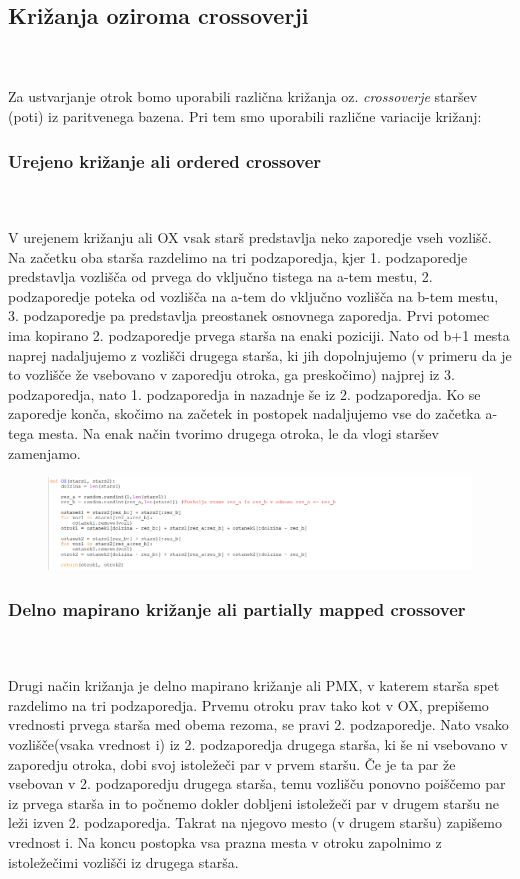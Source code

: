 \documentclass[12pt,a4paper]{amsart}
\theoremstyle{definition} %
\theoremstyle{plain} %
\begin{document}
\subsection{Križanja oziroma crossoverji}
\
\\
\\
Za ustvarjanje otrok bomo uporabili različna križanja oz. \textit{crossoverje} staršev (poti) iz paritvenega bazena. Pri tem smo uporabili različne variacije križanj: 
\\
\subsubsection{Urejeno križanje ali ordered crossover}
\
\\
\\
V urejenem križanju ali OX vsak starš predstavlja neko zaporedje vseh vozlišč. Na začetku oba starša razdelimo na tri podzaporedja, kjer 1. podzaporedje predstavlja vozlišča od prvega do vključno tistega na a-tem mestu, 2. podzaporedje poteka od vozlišča na a-tem do vključno vozlišča na b-tem mestu, 3. podzaporedje pa predstavlja preostanek osnovnega zaporedja. Prvi potomec ima kopirano 2. podzaporedje prvega starša na enaki poziciji. Nato od b+1 mesta naprej nadaljujemo z vozlišči drugega starša, ki jih dopolnjujemo (v primeru da je to vozlišče že vsebovano v zaporedju otroka, ga preskočimo) najprej iz 3. podzaporedja, nato 1. podzaporedja in nazadnje še iz 2. podzaporedja. Ko se zaporedje konča, skočimo na začetek in postopek nadaljujemo vse do začetka a-tega mesta. 
Na enak način tvorimo drugega otroka, le da vlogi staršev zamenjamo.

\begin{figure}[ht]
\centering
\includegraphics[width=1\textwidth]{OX}
\end{figure}
\newpage
\subsubsection{Delno mapirano križanje ali partially mapped crossover}
\
\\
\\
Drugi način križanja je delno mapirano križanje ali PMX, v katerem starša spet razdelimo na tri podzaporedja. Prvemu otroku prav tako kot v OX, prepišemo vrednosti prvega starša med obema rezoma, se pravi 2. podzaporedje. Nato vsako vozlišče(vsaka vrednost i) iz 2. podzaporedja drugega starša, ki še ni vsebovano v zaporedju otroka, dobi svoj istoležeči par v prvem staršu. Če je ta par že vsebovan v 2. podzaporedju drugega starša, temu vozlišču ponovno poiščemo par iz prvega starša in to počnemo dokler dobljeni istoležeči par v drugem staršu ne leži izven 2. podzaporedja.  Takrat na njegovo mesto (v drugem staršu) zapišemo vrednost i. Na koncu postopka vsa prazna mesta v otroku zapolnimo z istoležečimi vozlišči iz drugega starša. 
\end{document}

